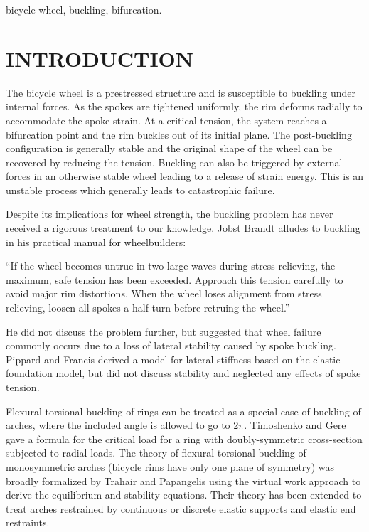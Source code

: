 \documentclass{bmd2016p}
\begin{document}
\begin{keywords}
bicycle wheel, 
buckling, 
bifurcation.
\end{keywords}

\section{INTRODUCTION}

The bicycle wheel is a prestressed structure and is susceptible to buckling under internal forces. As the spokes are tightened uniformly, the rim deforms radially to accommodate the spoke strain. At a critical tension, the system reaches a bifurcation point and the rim buckles out of its initial plane. The post-buckling configuration is generally stable and the original shape of the wheel can be recovered by reducing the tension. Buckling can also be triggered by external forces in an otherwise stable wheel leading to a release of strain energy. This is an unstable process which generally leads to catastrophic failure.

Despite its implications for wheel strength, the buckling problem has never received a rigorous treatment to our knowledge. Jobst Brandt alludes to buckling in his practical manual for wheelbuilders\cite{Brandt1993c}:

``If the wheel becomes untrue in two large waves during stress relieving, the maximum, safe tension has been exceeded. Approach this tension carefully to avoid major rim distortions. When the wheel loses alignment from stress relieving, loosen all spokes a half turn before retruing the wheel.''

He did not discuss the problem further, but suggested that wheel failure commonly occurs due to a loss of lateral stability caused by spoke buckling. Pippard and Francis\cite{Pippard1932d} derived a model for lateral stiffness based on the elastic foundation model, but did not discuss stability and neglected any effects of spoke tension.

Flexural-torsional buckling of rings can be treated as a special case of buckling of arches, where the included angle is allowed to go to $2\pi$. Timoshenko and Gere\cite{Timoshenko1961a} gave a formula for the critical load for a ring with doubly-symmetric cross-section subjected to radial loads. The theory of flexural-torsional buckling of monosymmetric arches (bicycle rims have only one plane of symmetry) was broadly formalized by Trahair and Papangelis\cite{Trahair1987b} using the virtual work approach to derive the equilibrium and stability equations. Their theory has been extended to treat arches restrained by continuous\cite{Pi2002b} or discrete\cite{Bradford2002d} elastic supports and elastic end restraints\cite{Guo2014b}.
\end{document}
